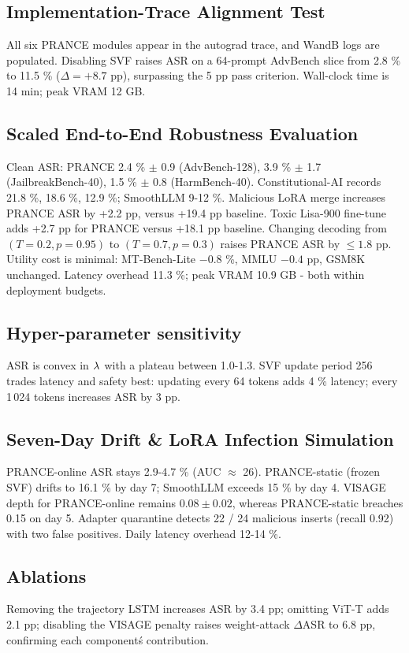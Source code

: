 \documentclass{article}
\begin{document}
\subsection{Implementation-Trace Alignment Test}
All six PRANCE modules appear in the autograd trace, and WandB logs are populated. Disabling SVF raises ASR on a 64-prompt AdvBench slice from 2.8 \% to 11.5 \% ($\Delta = +8.7$ pp), surpassing the 5 pp pass criterion. Wall-clock time is 14 min; peak VRAM 12 GB.
\subsection{Scaled End-to-End Robustness Evaluation}
Clean ASR: PRANCE 2.4 \% $\pm$ 0.9 (AdvBench-128), 3.9 \% $\pm$ 1.7 (JailbreakBench-40), 1.5 \% $\pm$ 0.8 (HarmBench-40). Constitutional-AI records 21.8 \%, 18.6 \%, 12.9 \%; SmoothLLM 9-12 \%. Malicious LoRA merge increases PRANCE ASR by +2.2 pp, versus +19.4 pp baseline. Toxic Lisa-900 fine-tune adds +2.7 pp for PRANCE versus +18.1 pp baseline. Changing decoding from $(T = 0.2, p = 0.95)$ to $(T = 0.7, p = 0.3)$ raises PRANCE ASR by $\leq 1.8$ pp. Utility cost is minimal: MT-Bench-Lite $-0.8$ \%, MMLU $-0.4$ pp, GSM8K unchanged. Latency overhead 11.3 \%; peak VRAM 10.9 GB - both within deployment budgets.
\subsection{Hyper-parameter sensitivity}
ASR is convex in $\lambda^{\*}$ with a plateau between 1.0-1.3. SVF update period 256 trades latency and safety best: updating every 64 tokens adds 4 \% latency; every 1\,024 tokens increases ASR by 3 pp.
\subsection{Seven-Day Drift \& LoRA Infection Simulation}
PRANCE-online ASR stays 2.9-4.7 \% (AUC $\approx$ 26). PRANCE-static (frozen SVF) drifts to 16.1 \% by day 7; SmoothLLM exceeds 15 \% by day 4. VISAGE depth for PRANCE-online remains $0.08 \pm 0.02$, whereas PRANCE-static breaches 0.15 on day 5. Adapter quarantine detects 22 / 24 malicious inserts (recall 0.92) with two false positives. Daily latency overhead 12-14 \%.
\subsection{Ablations}
Removing the trajectory LSTM increases ASR by 3.4 pp; omitting ViT-T adds 2.1 pp; disabling the VISAGE penalty raises weight-attack $\Delta$ASR to 6.8 pp, confirming each component\'s contribution.
\end{document}
